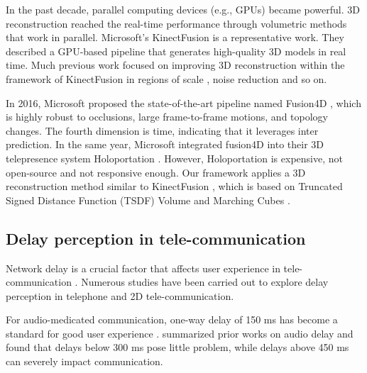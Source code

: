 In the past decade, parallel computing devices (e.g., GPUs) became powerful. 3D reconstruction reached the real-time performance \cite{maimone2012real, loop2013real} through volumetric methods that work in parallel. Microsoft's KinectFusion \cite{izadi2011kinectfusion} is a representative work. They described a GPU-based pipeline that generates high-quality 3D models in real time. Much previous work focused on improving 3D reconstruction within the framework of KinectFusion in regions of scale \cite{niessner2013real, chen2013scalable}, noise reduction \cite{khoshelham2012accuracy, nguyen2012modeling, newcombe2015dynamicfusion} and so on.

In 2016, Microsoft proposed the state-of-the-art pipeline named Fusion4D \cite{dou2016fusion4d}, which is highly robust to occlusions, large frame-to-frame motions, and topology changes. The fourth dimension is time, indicating that it leverages inter prediction. In the same year, Microsoft integrated fusion4D into their 3D telepresence system Holoportation \cite{orts2016holoportation}. However, Holoportation is expensive, not open-source and not responsive enough. Our framework applies a 3D reconstruction method similar to KinectFusion \cite{izadi2011kinectfusion}, which is based on Truncated Signed Distance Function (TSDF) Volume \cite{curless1996volumetric} and Marching Cubes \cite{lorensen1987marching}.

\subsection{Delay perception in tele-communication}

Network delay is a crucial factor that affects user experience in tele-communication \cite{brunnstrom2013qualinet, schmitt2013qoe, wu2009quality}. Numerous studies have been carried out to explore delay perception in telephone and 2D tele-communication.


For audio-medicated communication, one-way delay of 150 ms has become a standard for good user experience \cite{recommendation2003114}. \cite{gergle2006impact} summarized prior works on audio delay and found that delays below 300 ms pose little problem, while delays above 450 ms can severely impact communication.

